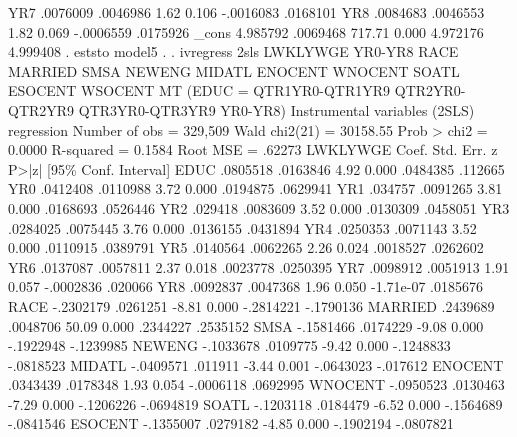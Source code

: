          YR7 {\VBAR}   .0076009   .0046986     1.62   0.106    -.0016083    .0168101
         YR8 {\VBAR}   .0084683   .0046553     1.82   0.069    -.0006559    .0175926
       _cons {\VBAR}   4.985792   .0069468   717.71   0.000     4.972176    4.999408
{\smallskip}
. eststo model5
{\smallskip}
. 
. ivregress 2sls LWKLYWGE YR0-YR8 RACE MARRIED SMSA NEWENG MIDATL ENOCENT WNOCENT SOATL ESOCENT WSOCENT MT  (EDUC = QTR1YR0-QTR1YR9 QTR2YR0-QTR2YR9 QTR3YR0-QTR3YR9 YR0-YR8)
{\smallskip}
Instrumental variables (2SLS) regression          Number of obs   =    329,509
                                                  Wald chi2(21)   =   30158.55
                                                  Prob > chi2     =     0.0000
                                                  R-squared       =     0.1584
                                                  Root MSE        =     .62273
{\smallskip}
    LWKLYWGE {\VBAR}      Coef.   Std. Err.      z    P>|z|     [95\% Conf. Interval]
        EDUC {\VBAR}   .0805518   .0163846     4.92   0.000     .0484385     .112665
         YR0 {\VBAR}   .0412408   .0110988     3.72   0.000     .0194875    .0629941
         YR1 {\VBAR}    .034757   .0091265     3.81   0.000     .0168693    .0526446
         YR2 {\VBAR}    .029418   .0083609     3.52   0.000     .0130309    .0458051
         YR3 {\VBAR}   .0284025   .0075445     3.76   0.000     .0136155    .0431894
         YR4 {\VBAR}   .0250353   .0071143     3.52   0.000     .0110915    .0389791
         YR5 {\VBAR}   .0140564   .0062265     2.26   0.024     .0018527    .0262602
         YR6 {\VBAR}   .0137087   .0057811     2.37   0.018     .0023778    .0250395
         YR7 {\VBAR}   .0098912   .0051913     1.91   0.057    -.0002836     .020066
         YR8 {\VBAR}   .0092837   .0047368     1.96   0.050    -1.71e-07    .0185676
        RACE {\VBAR}  -.2302179   .0261251    -8.81   0.000    -.2814221   -.1790136
     MARRIED {\VBAR}   .2439689   .0048706    50.09   0.000     .2344227    .2535152
        SMSA {\VBAR}  -.1581466   .0174229    -9.08   0.000    -.1922948   -.1239985
      NEWENG {\VBAR}  -.1033678   .0109775    -9.42   0.000    -.1248833   -.0818523
      MIDATL {\VBAR}  -.0409571    .011911    -3.44   0.001    -.0643023    -.017612
     ENOCENT {\VBAR}   .0343439   .0178348     1.93   0.054    -.0006118    .0692995
     WNOCENT {\VBAR}  -.0950523   .0130463    -7.29   0.000    -.1206226   -.0694819
       SOATL {\VBAR}  -.1203118   .0184479    -6.52   0.000    -.1564689   -.0841546
     ESOCENT {\VBAR}  -.1355007   .0279182    -4.85   0.000    -.1902194   -.0807821
